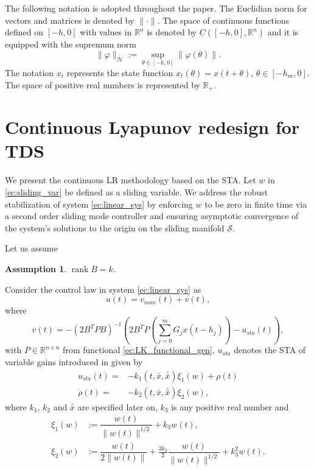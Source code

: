 \documentclass[onecolumn]{IEEEtran}
\newtheorem{assum}{Assumption}
\DeclareMathOperator{\rank}{rank}
\begin{document}
The following notation is adopted  throughout the paper.  The Euclidian norm for vectors and matrices  is denoted by $\|\cdot\|$.  The space of  continuous functions defined on $[-h,0]$ with values in $\mathbb{R}^n$ is denoted by $C\left([-h,0],\mathbb{R}^n\right)$  and it is equipped with the supremum norm
$$\|\varphi\|_{\mathcal{H}}:=\sup_{\theta \in [-h,0]}\|\varphi(\theta)\|.$$  The notation $x_t$ represents the state function $x_t(\theta)=x(t+\theta)$, $\theta\in [-h_m,0]$.
The space of positive real numbers is represented by $\mathbb{R}_+$.

\section{Continuous Lyapunov redesign for TDS}
\label{sec:STA}

We present the continuous LR methodology based on the STA. Let $w$ in \eqref{ec:sliding_var} be defined as a sliding variable. We address the robust stabilization of system \eqref{ec:linear_sys} by enforcing $w$ to be zero in finite time via a second order sliding mode controller and ensuring  asymptotic convergence of the system's solutions to the origin  on the sliding manifold $\mathcal{S}$. 


Let us assume 
\begin{assum}
	\label{ass:matrix_B}
	$\rank B=k$.
\end{assum}
Consider the control law in system \eqref{ec:linear_sys} as
\begin{equation}
\label{ec:control}
u(t)=v_{nom}(t)+v(t),
\end{equation}
where
\begin{equation}
\label{ec:control_unc_sta}
v(t)=-\left(2B^TPB\right)^{-1}(2B^TP\left(\sum_{j=0}^{m}G_jx(t-h_j)\right)-u_{sta}(t)),
\end{equation}
with $P\in \mathbb{R}^{n\times n}$ from functional \eqref{ec:LK_functional_gen}, $u_{sta}$ denotes the STA  of variable gains introduced in \cite{Moreno2011,Vidaletal2016}  given by
\begin{equation}
\label{ec:STA}
\begin{split}
u_{sta}(t)=&-k_1(t,\bar x,\bar{\bar {x}} )\xi_1(w)+\rho(t)\\
\dot \rho(t)=&-k_2(t,\bar x,\bar{\bar {x}} )\xi_2(w),
\end{split}
\end{equation}
where $k_1$, $k_2$ and $\bar {\bar x}$ are specified later  on, $k_3$ is any positive real number and
\begin{equation*}
\begin{split}
\xi_1(w)&:=\dfrac{w(t)}{\|w(t)\|^{1/2}}+k_3w(t),\\
\xi_2(w)&:=\dfrac{w(t)}{2\|w(t)\|}+\frac{3k_3}{2}\dfrac{w(t)}{\|w(t)\|^{1/2}}+k_3^2w(t).
\end{split}
\end{equation*}
\end{document}
